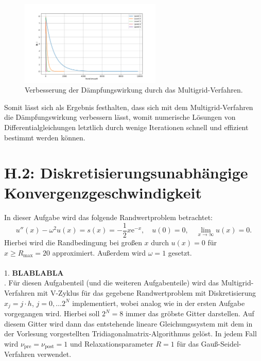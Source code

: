 \documentclass[11pt,a4paper]{article}
\begin{document}
\begin{figure}[htbp]
    \centering
    \includegraphics[width=0.6\textwidth,scale=0.7]{h1_level_comparison}
    \caption[Verbesserung der Dämpfungswirkung durch das Multigrid-Verfahren.]{Verbesserung der Dämpfungswirkung durch das Multigrid-Verfahren.}\label{fig:h1_level_comparison}
\end{figure} Somit lässt sich als Ergebnis festhalten, dass sich mit dem Multigrid-Verfahren die Dämpfungswirkung verbessern lässt, womit numerische Lösungen von Differentialgleichungen letztlich durch wenige Iterationen schnell und effizient bestimmt werden können.\newpage

\section*{H.2: Diskretisierungsunabhängige Konvergenzgeschwindigkeit}\label{sec:h2}

In dieser Aufgabe wird das folgende Randwertproblem betrachtet:
\begin{equation*}
    u''(x) - \omega^2 u(x) = s(x) = -\frac{1}{2} x \mathrm{e}^{-x} , \quad u(0) = 0 , \quad \lim_{x \to \infty} u(x) = 0.
\end{equation*} Hierbei wird die Randbedingung bei großen $x$ durch $u(x) = 0$ für $x \geq R_{\mathrm{max}} = 20$ approximiert. Außerdem wird $\omega = 1$ gesetzt.\\ \\
1. \textbf{BLABLABLA} \\

. Für diesen Aufgabenteil (und die weiteren Aufgabenteile) wird das Multigrid-Verfahren mit V-Zyklus für das gegebene Randwertproblem mit Diskretisierung $x_j = j \cdot h$, $j = 0 , \dots 2^N$ implementiert, wobei analog
wie in der ersten Aufgabe vorgegangen wird. Hierbei soll $2^N = 8$ immer das gröbste Gitter darstellen. Auf diesem Gitter wird dann das entstehende lineare Gleichungssystem mit dem in der Vorlesung vorgestellten Tridiagonalmatrix-Algorithmus gelöst.
In jedem Fall wird $\nu_{\mathrm{pre}} = \nu_{\mathrm{post}} = 1$ und Relaxationsparameter $R = 1$ für das Gauß-Seidel-Verfahren verwendet. \\
\end{document}
